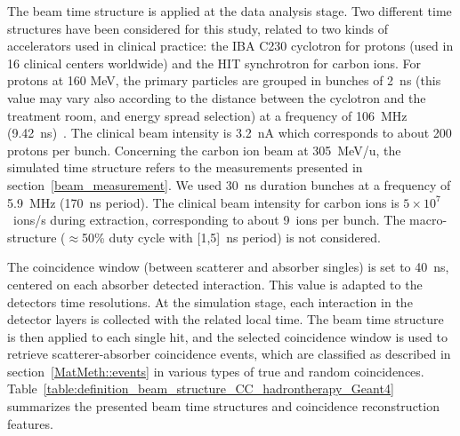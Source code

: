 The beam time structure is applied at the data analysis stage. Two different time structures have been considered for this study, related to two kinds of accelerators used in clinical practice: the IBA C230 cyclotron for protons (used in 16 clinical centers worldwide) and the HIT synchrotron for carbon ions. For protons at 160 MeV, the primary particles are grouped in bunches of 2~ns (this value may vary also according to the distance between the cyclotron and the treatment room, and energy spread selection) at a frequency of 106~MHz (9.42~ns)~\cite{Roellinghoff_2014}. The clinical beam intensity is 3.2~nA which corresponds to about 200 protons per bunch. Concerning the carbon ion beam at 305~MeV/u, the simulated time structure refers to the measurements presented in section~\ref{beam_measurement}. We used 30~ns duration bunches at a frequency of 5.9~MHz (170~ns period). The clinical beam intensity for carbon ions is $5\times10^7$~ions/s during extraction, corresponding to about 9~ions per bunch. The macro-structure ($\approx$50\% duty cycle with [1,5]~ns period) is not considered. 

The coincidence window (between scatterer and absorber singles) is set to 40~ns, centered on each absorber detected interaction. This value is adapted to the detectors time resolutions. At the simulation stage, each interaction in the detector layers is collected with the related local time. The beam time structure is then applied to each single hit, and the selected coincidence window is used to retrieve scatterer-absorber coincidence events, which are classified as described in section~\ref{MatMeth::events} in various types of true and random coincidences. Table~\ref{table:definition_beam_structure_CC_hadrontherapy_Geant4} summarizes the presented beam time structures and coincidence reconstruction features.

